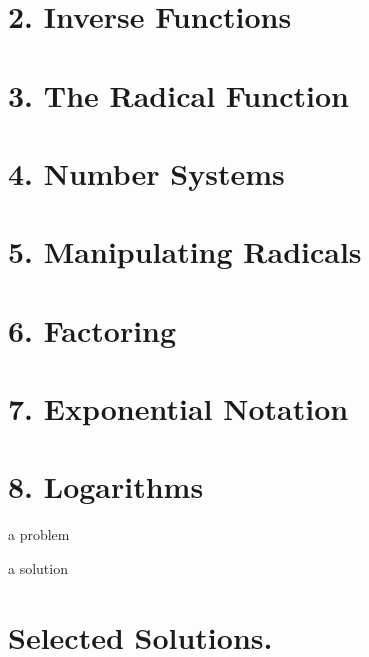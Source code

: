 \documentclass[12pt,fleqn]{book}
\newcommand{\prb}[1]{\begin{Exercise}#1\end{Exercise}}
\newcommand{\sol}[1]{\begin{Answer}#1\end{Answer}}
\begin{document}
\chapter{2. Inverse Functions}
\chapter{3. The Radical Function}
\chapter{4. Number Systems}
\chapter{5. Manipulating Radicals}
\chapter{6. Factoring}
\chapter{7. Exponential Notation}
\chapter{8. Logarithms}
\prb{a problem}
\sol{a solution}
\chapter{Selected Solutions.}
\shipoutAnswer
\end{document}
